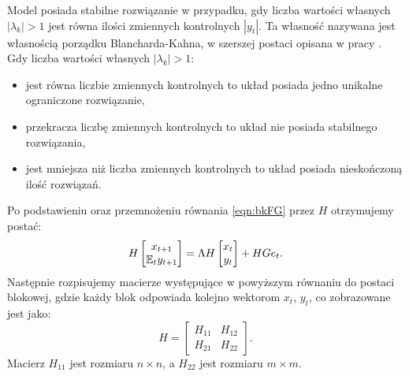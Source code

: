 Model posiada stabilne rozwiązanie w przypadku, gdy liczba wartości własnych $|\lambda_k| > 1$ jest równa ilości zmiennych kontrolnych $|y_t|$. Ta własność nazywana jest własnością porządku Blancharda-Kahna, w szerszej postaci opisana w pracy \cite{10.2307/1912186}. Gdy liczba wartości własnych $|\lambda_k| > 1$:
\begin{itemize}
    \item jest równa liczbie zmiennych kontrolnych to układ posiada jedno unikalne ograniczone rozwiązanie,
    \item przekracza liczbę zmiennych kontrolnych to układ nie posiada stabilnego rozwiązania,
    \item jest mniejsza niż liczba zmiennych kontrolnych to układ posiada nieskończoną ilość rozwiązań.
\end{itemize}
Po podstawieniu oraz przemnożeniu równania \eqref{eqn:bkFG} przez $H$ otrzymujemy postać:
\begin{equation}
    \label{eq:post_jordan_blanchardKahn}
    H
    \begin{bmatrix}
    x_{t+1} \\
    \mathbb{E}_t y_{t+1}
\end{bmatrix} = \Lambda H \begin{bmatrix}
    x_{t} \\
    y_{t}
\end{bmatrix} + H G e_t.
\end{equation}
Następnie rozpisujemy macierze występujące w powyższym równaniu do postaci blokowej, gdzie każdy blok odpowiada kolejno wektorom $x_t$, $y_t$, co zobrazowane jest jako:
\begin{equation}
    H = \begin{bmatrix}
    H_{11} & H_{12} \\
    H_{21} & H_{22}
    \end{bmatrix}.
\end{equation}
Macierz $H_{11}$ jest rozmiaru $n \times n$, a $H_{22}$ jest rozmiaru $m \times m$. 

